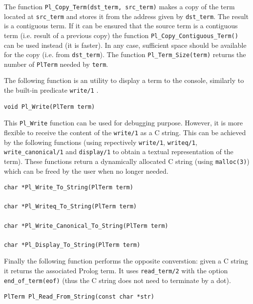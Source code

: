 The function \texttt{Pl\_Copy\_Term(dst\_term, src\_term)} makes a copy of the
term located at \texttt{src\_term} and stores it from the address given by
\texttt{dst\_term}. The result is a contiguous term. If it can be ensured
that the source term is a contiguous term (i.e. result of a previous copy)
the function \texttt{Pl\_Copy\_Contiguous\_Term()} can be used instead (it is
faster). In any case, sufficient space should be available for the copy
(i.e. from \texttt{dst\_term}). The function \texttt{Pl\_Term\_Size(term)}
returns the number of \texttt{PlTerm} needed by \texttt{term}.

The following function is an utility to display a term to the console, similarly to
the built-in predicate \texttt{write/1} .

\begin{Code}
\begin{verbatim}
void Pl_Write(PlTerm term)
\end{verbatim}
\end{Code}

This \texttt{Pl\_Write} function can be used for debugging purpose. However, it is more
flexible to receive the content of the \texttt{write/1} as a C string. This can be
achieved by the following functions (using repectively \texttt{write/1},
\texttt{writeq/1}, \texttt{write\_canonical/1} and \texttt{display/1}
 to obtain a textual representation of the term). These functions
return a dynamically allocated C string (using \texttt{malloc(3)}) which can be freed
by the user when no longer needed.

\begin{Code}
\begin{verbatim}
char *Pl_Write_To_String(PlTerm term)

char *Pl_Writeq_To_String(PlTerm term)

char *Pl_Write_Canonical_To_String(PlTerm term)

char *Pl_Display_To_String(PlTerm term)
\end{verbatim}
\end{Code}


Finally the following function performs the opposite converstion: given a C string it
returns the associated Prolog term. It uses \texttt{read\_term/2} 
with the option \texttt{end\_of\_term(eof)} (thus the C string does not need to
terminate by a dot).

\begin{Code}
\begin{verbatim}
PlTerm Pl_Read_From_String(const char *str)
\end{verbatim}
\end{Code}




